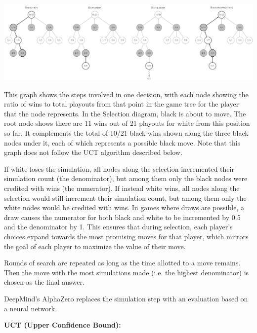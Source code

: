 \documentclass{article}
\begin{document}
\begin{center}
\includegraphics[scale=0.1]{./images/mcts_steps.png}
\end{center}

\noindent This graph shows the steps involved in one decision, with each node showing the ratio of wins to total playouts from that point in the game tree for the player that the node represents. In the Selection diagram, black is about to move. The root node shows there are 11 wins out of 21 playouts for white from this position so far. It complements the total of 10/21 black wins shown along the three black nodes under it, each of which represents a possible black move. Note that this graph does not follow the UCT algorithm described below.

\bigskip

\noindent If white loses the simulation, all nodes along the selection incremented their simulation count (the denominator), but among them only the black nodes were credited with wins (the numerator). If instead white wins, all nodes along the selection would still increment their simulation count, but among them only the white nodes would be credited with wins. In games where draws are possible, a draw causes the numerator for both black and white to be incremented by 0.5 and the denominator by 1. This ensures that during selection, each player's choices expand towards the most promising moves for that player, which mirrors the goal of each player to maximize the value of their move.

\bigskip

\noindent Rounds of search are repeated as long as the time allotted to a move remains. Then the move with the most simulations made (i.e. the highest denominator) is chosen as the final answer.

\bigskip

\noindent DeepMind's AlphaZero replaces the simulation step with an evaluation based on a neural network.

\bigskip

\noindent \textbf{UCT (Upper Confidence Bound):}
\end{document}
